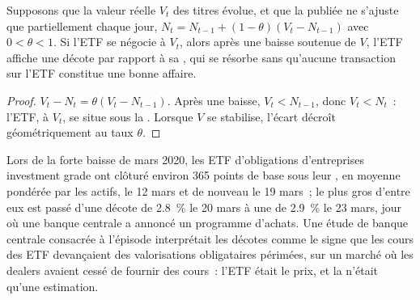 \begin{proposition}\label{prop:m1:exchange-traded-funds:stale}
Supposons que la valeur réelle $V_t$ des titres évolue, et que la  publiée
ne s'ajuste que partiellement chaque jour, $N_t = N_{t-1} + (1-\theta)(V_t - N_{t-1})$ avec
$0 < \theta < 1$. Si l'ETF se négocie à $V_t$, alors après une baisse soutenue de
$V$, l'ETF affiche une décote par rapport à sa , qui se résorbe
sans qu'aucune transaction sur l'ETF constitue une bonne affaire.
\end{proposition}
\begin{proof}
$V_t - N_t = \theta(V_t - N_{t-1})$. Après une baisse, $V_t < N_{t-1}$, donc $V_t <
N_t$~: l'ETF, à $V_t$, se situe sous la . Lorsque $V$ se stabilise, l'écart
décroît géométriquement au taux $\theta$.
\end{proof}

\begin{example}[Mars 2020]\label{ex:m1:exchange-traded-funds:march}
Lors de la forte baisse de mars 2020, les ETF d'obligations d'entreprises investment grade
ont clôturé environ 365 points de base sous leur , en moyenne pondérée par les actifs,
le 12 mars et de nouveau le 19 mars~; le plus gros d'entre eux est passé d'une décote
de 2.8~\% le 20 mars à une  de 2.9~\% le 23 mars, jour où une banque centrale
a annoncé un programme d'achats. Une étude de banque centrale consacrée à l'épisode
interprétait les décotes comme le signe que les cours des ETF devançaient des valorisations obligataires périmées, sur un marché
où les dealers avaient cessé de fournir des cours~: l'ETF était le prix, et la
 n'était qu'une estimation.
\end{example}

